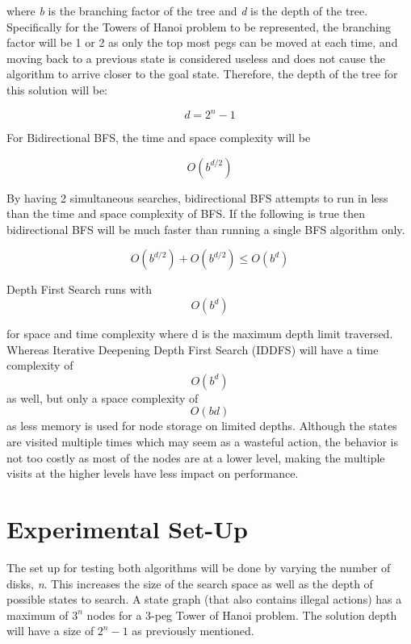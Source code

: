 \documentclass[conference]{IEEEtran}
\begin{document}
where \textit{b} is the branching factor of the tree and \textit{d} is the depth of the tree. Specifically for the Towers of Hanoi problem to be represented, the branching factor will be 1 or 2 as only the top most pegs can be moved at each time, and moving back to a previous state is considered useless and does not cause the algorithm to arrive closer to the goal state. Therefore, the depth of the tree for this solution will be:

\begin{equation}
d = 2^n - 1
\end{equation}

For Bidirectional BFS, the time and space complexity will be 

\begin{equation}
 O(b^{d/2})
\end{equation}

By having 2 simultaneous searches, bidirectional BFS attempts to run in less than the time and space complexity of BFS. If 
the following is true then bidirectional BFS will be much faster than running a single BFS algorithm only. \cite{Textbook01}

\begin{equation}
O(b^{d/2}) + O(b^{d/2}) \leq O(b^d)
\end{equation}

Depth First Search runs with 
\begin{equation}
 O(b^{d})
\end{equation}

for space and time complexity where d is the maximum depth limit traversed. Whereas Iterative Deepening Depth First Search (IDDFS) will have a time complexity of \begin{equation}
O(b^{d})
\end{equation} as well, but only a space complexity of \begin{equation} O(bd)\end{equation} as less memory is used for node storage on limited depths. Although the states are visited multiple times which may seem as a wasteful action, the behavior is not too costly as most of the nodes are at a lower level, making the multiple visits at the higher levels have less impact on performance.


\section{Experimental Set-Up}
The set up for testing both algorithms will be done by varying the number of disks, \textit{n}. This increases the size of the search space as well as the depth of possible states to search. A state graph (that also contains illegal actions) has a maximum of $3^n$ nodes for a 3-peg Tower of Hanoi problem. The solution depth will have a size of $2^n-1$ as previously mentioned.
\end{document}
